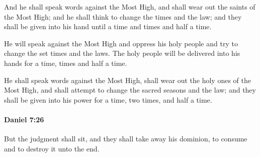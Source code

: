 			\begin{versebox}
					\item[BHS] 
					\item[LXX] 
					\item[ASV] And he shall speak words against the Most High, and shall wear out the saints of the Most High; and he shall think to change the times and the law; and they shall be given into his hand until a time and times and half a time.
					\item[NIV] He will speak against the Most High and oppress his holy people and try to change the set times and the laws. The holy people will be delivered into his hands for a time, times and half a time.
					\item[NRSV] He shall speak words against the Most High, shall wear out the holy ones of the Most High, and shall attempt to change the sacred seasons and the law; and they shall be given into his power for a time, two times, and half a time.
			\end{versebox}

		\paragraph{Daniel 7:26} %
			\label{DANIEL-7-26}

			But the judgment shall sit, and they shall take away his dominion, to consume and to destroy it unto the end.

